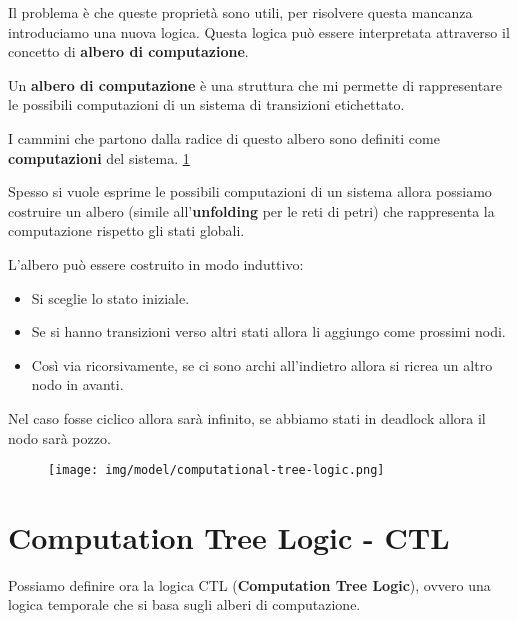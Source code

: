 Il problema è che queste proprietà sono utili, per risolvere questa mancanza
introduciamo una nuova logica. Questa logica può essere interpretata attraverso
il concetto di \textbf{albero di computazione}.
\begin{definizione}
    Un \textbf{albero di computazione} è una struttura che mi permette di
    rappresentare le possibili computazioni di un sistema di transizioni
    etichettato.

    I cammini che partono dalla radice di questo albero sono definiti come
    \textbf{computazioni} del sistema. \ref{fig:computational-tree-logic}
\end{definizione}
\begin{nota}
    Spesso si vuole esprime le possibili computazioni di un sistema allora
    possiamo costruire un albero (simile all'\textbf{unfolding} per le reti di
    petri) che rappresenta la computazione rispetto gli stati globali.

    L'albero può essere costruito in modo induttivo:
    \begin{itemize}
        \item Si sceglie lo stato iniziale.
        \item Se si hanno transizioni verso altri stati allora li aggiungo come
              prossimi nodi.
        \item Così via ricorsivamente, se ci sono archi all'indietro allora
              si ricrea un altro nodo in avanti.
    \end{itemize}
    Nel caso fosse ciclico allora sarà infinito, se abbiamo stati in deadlock
    allora il nodo sarà pozzo.
\end{nota}
\begin{figure}
    \centering
    \texttt{[image: img/model/computational-tree-logic.png]}
    \label{fig:computational-tree-logic}
\end{figure}
\section{Computation Tree Logic - CTL}
Possiamo definire ora la logica CTL (\textbf{Computation Tree Logic}), ovvero
una logica temporale che si basa sugli alberi di computazione.


